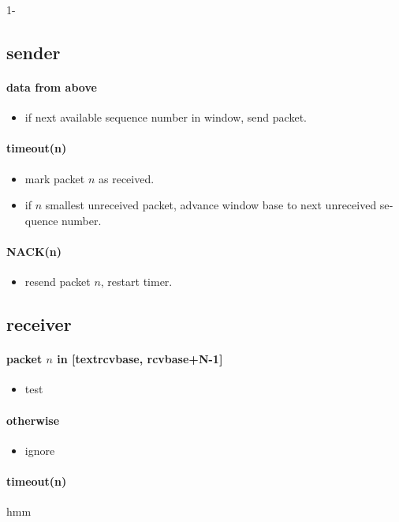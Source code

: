 1-

\begin{latin}
\subsection*{sender}
\paragraph{data from above}
	\begin{itemize}
		\item if next available sequence number in window, send packet.
	\end{itemize}

\paragraph{timeout(n)}
	\begin{itemize}
		\item mark packet $n$ as received.
		\item if $n$ smallest unreceived packet, advance window base to next unreceived sequence number.
	\end{itemize}

\paragraph{NACK(n)}
	\begin{itemize}
		\item resend packet $n$, restart timer.
	\end{itemize}	
	
\hline

\subsection*{receiver}
\paragraph{packet $n$ in [text{rcvbase, rcvbase}+N-1] }
\begin{itemize}
	\item test
\end{itemize}


\paragraph{otherwise}
	\begin{itemize}
		\item ignore
	\end{itemize}

\paragraph{timeout(n)}
	hmm
	
\end{latin}

